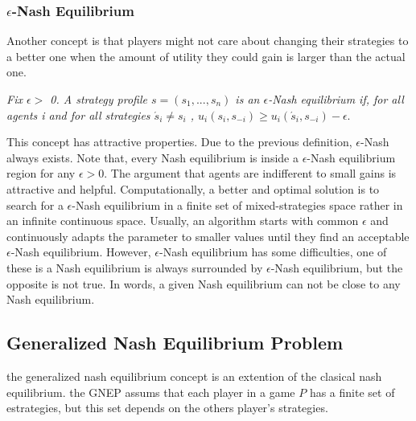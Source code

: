\subsubsection{$\epsilon$-Nash Equilibrium}
Another concept is that players might not care about changing their strategies to a better one when the amount of utility they could gain is larger than the actual one. 

\begin{definition}
\textit{Fix $\epsilon >$ 0. A strategy profile $s=(s_1,...,s_n)$ is an $\epsilon$-Nash equilibrium if, for all agents i and for all strategies $\acute{s}_i \neq s_i$ , $u_i(s_i, s_{-i}) \ge u_i(\acute{s}_i, s_{-i}) -\epsilon.$ }
\end{definition}




This concept has attractive properties. Due to the previous definition, $\epsilon$-Nash always exists. Note that, every Nash equilibrium is inside a $\epsilon$-Nash equilibrium region for any $\epsilon >0$. The argument that agents are indifferent to small gains is attractive and helpful. Computationally, a better and optimal solution is to search for a $\epsilon$-Nash equilibrium in a finite set of mixed-strategies space rather in an infinite continuous space.
Usually, an algorithm starts with common $\epsilon$ and continuously adapts the parameter to smaller values until they find an acceptable $\epsilon$-Nash equilibrium. However, $\epsilon$-Nash equilibrium has some difficulties, one of these is a Nash equilibrium is always surrounded by $\epsilon$-Nash equilibrium, but the opposite is not true. In words, a given Nash equilibrium can not be close to any Nash equilibrium. \cite{29t_book}




\subsection{Generalized Nash Equilibrium Problem}

the generalized nash equilibrium concept is an extention of the clasical nash equilibrium. the GNEP assums that each player in a game $P$ has a finite set of estrategies, but this set depends on the others player's strategies.

